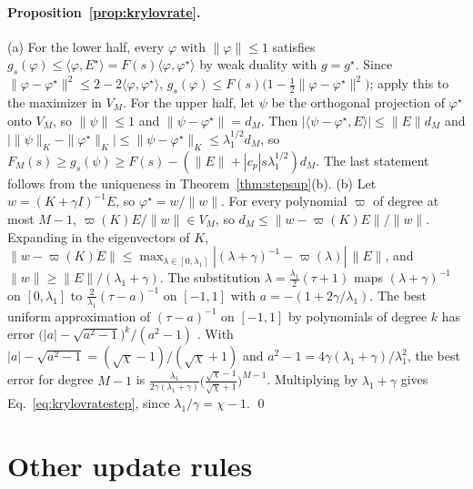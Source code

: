 \documentclass[11pt]{article}
\theoremstyle{definition}
\theoremstyle{remark}
\newcommand{\ip}[2]{\langle #1,#2\rangle}
\begin{document}
\paragraph{Proposition~\ref{prop:krylovrate}.}
(a) For the lower half, every $\varphi$ with $\|\varphi\|\le1$ satisfies $g_s(\varphi) \le \ip{\varphi}{E^\star} = F(s)\ip{\varphi}{\varphi^\star}$ by weak duality with $g = g^\star$.
Since $\|\varphi - \varphi^\star\|^2 \le 2 - 2\ip{\varphi}{\varphi^\star}$, $g_s(\varphi) \le F(s)\big(1 - \tfrac12\|\varphi - \varphi^\star\|^2\big)$; apply this to the maximizer in $V_M$.
For the upper half, let $\psi$ be the orthogonal projection of $\varphi^\star$ onto $V_M$, so $\|\psi\|\le1$ and $\|\psi - \varphi^\star\| = d_M$.
Then $|\ip{\psi - \varphi^\star}{E}| \le \|E\|d_M$ and $\big|\|\psi\|_K - \|\varphi^\star\|_K\big| \le \|\psi - \varphi^\star\|_K \le \lambda_1^{1/2}d_M$, so $F_M(s) \ge g_s(\psi) \ge F(s) - (\|E\| + |c_p|s\lambda_1^{1/2})d_M$.
The last statement follows from the uniqueness in Theorem~\ref{thm:stepsup}(b).
(b) Let $w = (K+\gamma I)^{-1}E$, so $\varphi^\star = w/\|w\|$.
For every polynomial $\varpi$ of degree at most $M-1$, $\varpi(K)E/\|w\|\in V_M$, so $d_M \le \|w - \varpi(K)E\|/\|w\|$.
Expanding in the eigenvectors of $K$, $\|w - \varpi(K)E\| \le \max_{\lambda\in[0,\lambda_1]}|(\lambda+\gamma)^{-1} - \varpi(\lambda)|\,\|E\|$, and $\|w\| \ge \|E\|/(\lambda_1+\gamma)$.
The substitution $\lambda = \tfrac{\lambda_1}{2}(\tau+1)$ maps $(\lambda+\gamma)^{-1}$ on $[0,\lambda_1]$ to $\tfrac{2}{\lambda_1}(\tau - a)^{-1}$ on $[-1,1]$ with $a = -(1 + 2\gamma/\lambda_1)$.
The best uniform approximation of $(\tau - a)^{-1}$ on $[-1,1]$ by polynomials of degree $k$ has error $\big(|a| - \sqrt{a^2-1}\big)^k/(a^2-1)$ \cite{achieser1956}.
With $|a| - \sqrt{a^2-1} = (\sqrt\chi-1)/(\sqrt\chi+1)$ and $a^2-1 = 4\gamma(\lambda_1+\gamma)/\lambda_1^2$, the best error for degree $M-1$ is $\tfrac{\lambda_1}{2\gamma(\lambda_1+\gamma)}\big(\tfrac{\sqrt\chi-1}{\sqrt\chi+1}\big)^{M-1}$.
Multiplying by $\lambda_1+\gamma$ gives Eq.~\eqref{eq:krylovratestep}, since $\lambda_1/\gamma = \chi-1$. \qed

\section{Other update rules}\label{app:momentum}
\end{document}
